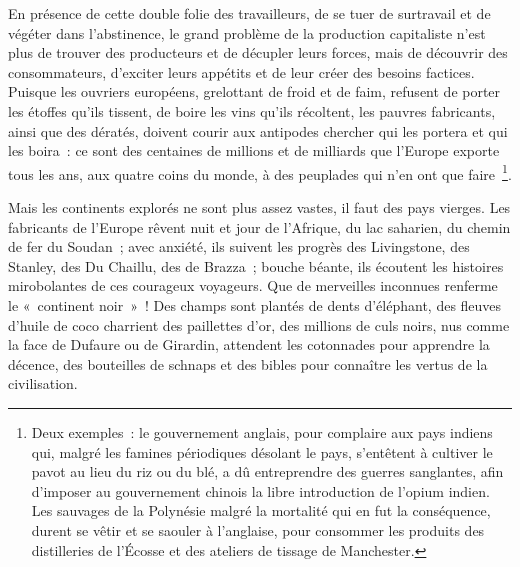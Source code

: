 \documentclass[french,twoside]{book} %
\begin{document}
En présence de cette double folie des travailleurs, de se tuer de surtravail et de végéter dans l’abstinence, le grand problème de la production capitaliste n’est plus de trouver des producteurs et de décupler leurs forces, mais de découvrir des consommateurs, d’exciter leurs appétits et de leur créer des besoins factices. Puisque les ouvriers européens, grelottant de froid et de faim, refusent de porter les étoffes qu’ils tissent, de boire les vins qu’ils récoltent, les pauvres fabricants, ainsi que des dératés, doivent courir aux antipodes chercher qui les portera et qui les boira : ce sont des centaines de millions et de milliards que l’Europe exporte tous les ans, aux quatre coins du monde, à des peuplades qui n’en ont que faire \footnote{Deux exemples : le gouvernement anglais, pour complaire aux pays indiens qui, malgré les famines périodiques désolant le pays, s’entêtent à cultiver le pavot au lieu du riz ou du blé, a dû entreprendre des guerres sanglantes, afin d’imposer au gouvernement chinois la libre introduction de l’opium indien. Les sauvages de la Polynésie malgré la mortalité qui en fut la conséquence, durent se vêtir et se saouler à l’anglaise, pour consommer les produits des distilleries de l’Écosse et des ateliers de tissage de Manchester.}.\par
Mais les continents explorés ne sont plus assez vastes, il faut des pays vierges. Les fabricants de l’Europe rêvent nuit et jour de l’Afrique, du lac saharien, du chemin de fer du Soudan ; avec anxiété, ils suivent les progrès des Livingstone, des Stanley, des Du Chaillu, des de Brazza ; bouche béante, ils écoutent les histoires mirobolantes de ces courageux voyageurs. Que de merveilles inconnues renferme le « continent noir » ! Des champs sont plantés de dents d’éléphant, des fleuves d’huile de coco charrient des paillettes d’or, des millions de culs noirs, nus comme la face de Dufaure ou de Girardin, attendent les cotonnades pour apprendre la décence, des bouteilles de schnaps et des bibles pour connaître les vertus de la civilisation.\par
\end{document}
